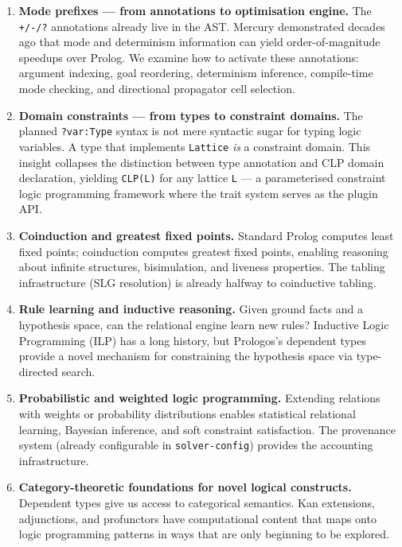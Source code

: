 \documentclass[11pt]{article}
\begin{document}
\begin{enumerate}
\item \textbf{Mode prefixes --- from annotations to optimisation engine.} The \texttt{+/-/?}
annotations already live in the AST. Mercury demonstrated decades ago that
mode and determinism information can yield order-of-magnitude speedups over
Prolog. We examine how to activate these annotations: argument indexing, goal
reordering, determinism inference, compile-time mode checking, and directional
propagator cell selection.

\item \textbf{Domain constraints --- from types to constraint domains.} The planned
\texttt{?var:Type} syntax is not mere syntactic sugar for typing logic variables. A
type that implements \texttt{Lattice} \emph{is} a constraint domain. This insight
collapses the distinction between type annotation and CLP domain declaration,
yielding \texttt{CLP(L)} for any lattice \texttt{L} --- a parameterised constraint logic
programming framework where the trait system serves as the plugin API.

\item \textbf{Coinduction and greatest fixed points.} Standard Prolog computes least fixed
points; coinduction computes greatest fixed points, enabling reasoning about
infinite structures, bisimulation, and liveness properties. The tabling
infrastructure (SLG resolution) is already halfway to coinductive tabling.

\item \textbf{Rule learning and inductive reasoning.} Given ground facts and a hypothesis
space, can the relational engine learn new rules? Inductive Logic Programming
(ILP) has a long history, but Prologos's dependent types provide a novel
mechanism for constraining the hypothesis space via type-directed search.

\item \textbf{Probabilistic and weighted logic programming.} Extending relations with
weights or probability distributions enables statistical relational learning,
Bayesian inference, and soft constraint satisfaction. The provenance system
(already configurable in \texttt{solver-config}) provides the accounting
infrastructure.

\item \textbf{Category-theoretic foundations for novel logical constructs.} Dependent types
give us access to categorical semantics. Kan extensions, adjunctions, and
profunctors have computational content that maps onto logic programming
patterns in ways that are only beginning to be explored.
\end{enumerate}
\end{document}
